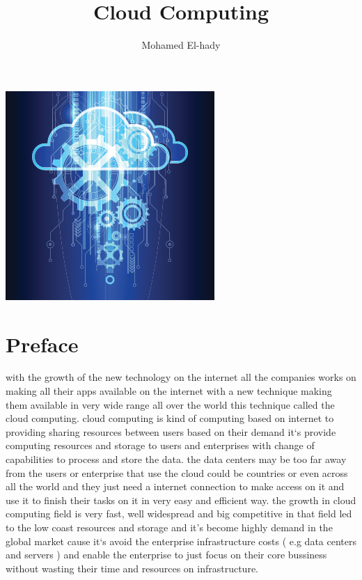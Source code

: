 \documentclass [12pt]{book}
\author{Mohamed El-hady}
\begin{document}
\includegraphics[scale=1.75,width=\textwidth]{cover}

\title{Cloud Computing }
	\maketitle
	 \tableofcontents 
	\chapter*{Preface}
	with the growth of the new technology on the internet all the companies works on making all their apps available on the internet with a new technique making them available in very wide range all over the world this technique called the cloud computing.
	\newline
	cloud computing is kind of computing based on internet to providing sharing resources between users based on their demand it`s provide computing resources and storage to users and enterprises with change of capabilities to process and store the data.
	\newline
	the data centers may be too far away from the users or enterprise that use the cloud could be countries or even across all the world and they just need a internet connection to make access on it and use it to finish their tasks on it in very easy and efficient way.
	\newline
	the growth in cloud computing field is very fast, well widespread and big competitive in that field led to the low coast resources and storage and it's become highly demand in the global market cause it`s avoid the enterprise infrastructure costs ( e.g data centers and servers )    and enable the enterprise to just focus on their core bussiness without wasting their time and resources on infrastructure.
	
\end{document}
